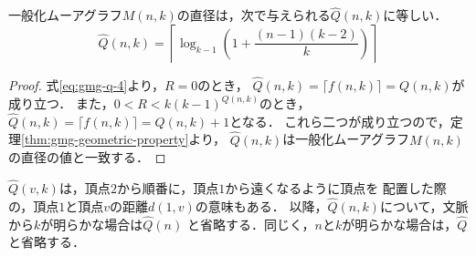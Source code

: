 \begin{theorem}
  \label{thm:gmg-diam}
  一般化ムーアグラフ$M(n,k)$の直径は，次で与えられる$\hat{Q}(n,k)$に等しい．
  \begin{equation}
    \hat{Q}(n,k)=
    \left\lceil\log_{k-1}\left(1+\frac{(n-1)(k-2)}{k}\right)\right\rceil
  \end{equation}
\end{theorem}
\begin{proof}
  式\ref{eq:gmg-q-4}より，$R=0$のとき，
  $\hat{Q}(n,k)=\lceil f(n,k)\rceil=Q(n,k)$が成り立つ．
  また，$0<R<k(k-1)^{Q(n,k)}$のとき，
  $\hat{Q}(n,k)=\lceil f(n,k)\rceil=Q(n,k)+1$となる．
  これら二つが成り立つので，定理\ref{thm:gmg-geometric-property}より，
  $\hat{Q}(n,k)$は一般化ムーアグラフ$M(n,k)$の直径の値と一致する．
\end{proof}
$\hat{Q}(v,k)$は，頂点$2$から順番に，頂点$1$から遠くなるように頂点を
配置した際の，頂点$1$と頂点$v$の距離$d(1,v)$の意味もある．
以降，$\hat{Q}(n,k)$について，文脈から$k$が明らかな場合は$\hat{Q}(n)$
と省略する．同じく，$n$と$k$が明らかな場合は，$\hat{Q}$と省略する．
